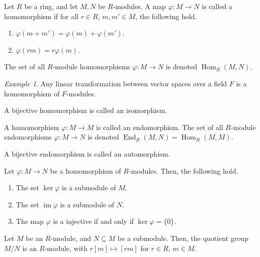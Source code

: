 \documentclass[11pt]{article}
\DeclareMathOperator{\im}{im}
\DeclareMathOperator{\Hom}{Hom}
\DeclareMathOperator{\End}{End}
\theoremstyle{definition}
\theoremstyle{remark}
\newtheorem*{example}{Example}
\numberwithin{equation}{section}
\begin{document}
    \begin{definition}
        Let $R$ be a ring, and let $M, N$ be $R$-modules. A map $\varphi\colon M \to
        N$ is called a homomorphism if for all $r \in R$, $m, m' \in M$, the
        following hold. \begin{enumerate}
            \itemsep0em
            \item $\varphi(m + m') = \varphi(m) + \varphi(m')$.
            \item $\varphi(rm) = r\varphi(m)$.
        \end{enumerate}
        The set of all $R$-module homomorphisms $\varphi\colon M \to N$ is denoted
        $\Hom_R(M, N)$.
    \end{definition}
    \begin{example}
        Any linear transformation between vector spaces over a field $F$ is a
        homomorphism of $F$-modules.
    \end{example}
    \begin{definition}
        A bijective homomorphism is called an isomorphism.
    \end{definition}
    \begin{definition}
        A homomorphism $\varphi\colon M \to M$ is called an endomorphism.
        The set of all $R$-module endomorphisms $\varphi\colon M \to N$ is denoted
        $\End_R(M, N) = \Hom_R(M, M)$.
    \end{definition}
    \begin{definition}
        A bijective endomorphism is called an automorphism.
    \end{definition}

    \begin{lemma}
        Let $\varphi\colon M \to N$ be a homomorphism of $R$-modules. Then, the
        following hold. \begin{enumerate}
            \itemsep0em
            \item The set $\ker\varphi$ is a submodule of $M$.
            \item The set $\im\varphi$ is a submodule of $N$.
            \item The map $\varphi$ is a injective if and only if $\ker\varphi =
            \{0\}$.
        \end{enumerate}
    \end{lemma}

    \begin{theorem}
        Let $M$ be an $R$-module, and $N\subseteq M$ be a submodule. Then, the
        quotient group $M/N$ is an $R$-module, with $r[m] \mapsto [rm]$ for $r \in
        R$, $m \in M$.
    \end{theorem}
\end{document}
